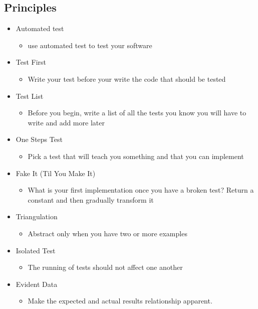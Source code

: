 \documentclass[a4, english]{article}
\begin{document}
\subsection{Principles}
\begin{itemize}
  \item Automated test
  \begin{itemize}
    \item use automated test to test your software
  \end{itemize}
  \item Test First
  \begin{itemize}
    \item Write your test before your write the code that should be tested
  \end{itemize}
  \item Test List
  \begin{itemize}
    \item Before you begin, write a list of all the tests you know you will have to write and add more later
  \end{itemize}
  \item One Steps Test
  \begin{itemize}
    \item Pick a test that will teach you something and that you can implement
  \end{itemize}
  \item Fake It (Til You Make It)
  \begin{itemize}
    \item What is your first implementation once you have a broken test? Return a constant and then gradually transform it 
  \end{itemize}
  \item Triangulation
  \begin{itemize}
    \item Abstract only when you have two or more examples
  \end{itemize}
  \item Isolated Test
  \begin{itemize}
    \item The running of tests should not affect one another
  \end{itemize}
  \item Evident Data
  \begin{itemize}
    \item Make the expected and actual results relationship apparent.
  \end{itemize}

\end{itemize}
\end{document}
